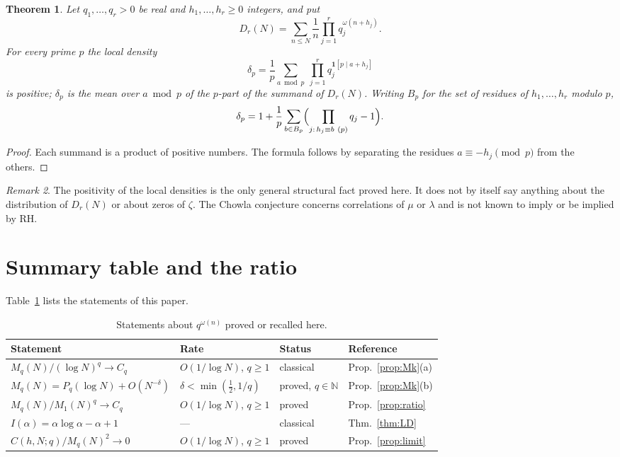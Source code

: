 \documentclass[11pt]{amsart}
\newtheorem{theorem}{Theorem}[section]
\theoremstyle{definition}
\theoremstyle{remark}
\newtheorem{remark}[theorem]{Remark}
\newcommand{\half}{\tfrac12}
\newcommand{\om}{\omega}
\begin{document}
\begin{theorem}\label{thm:impossible}
  Let $q_1,\ldots,q_r>0$ be real and $h_1,\ldots,h_r\ge 0$ integers, and put
  \[
    D_r(N) = \sum_{n\le N}\frac1n\prod_{j=1}^r q_j^{\om(n+h_j)}.
  \]
  For every prime $p$ the local density
  \[
    \delta_p=\frac1p\sum_{a\bmod p}\ \prod_{j=1}^r q_j^{\mathbf 1[p\mid a+h_j]}
  \]
  is positive; $\delta_p$ is the mean over $a\bmod p$ of the $p$-part of the summand of
  $D_r(N)$.  Writing $B_p$ for the set of residues of $h_1,\dots,h_r$ modulo $p$,
  \[
    \delta_p=1+\frac1p\sum_{b\in B_p}\Bigl(\prod_{j:\,h_j\equiv b\ (p)}q_j-1\Bigr).
  \]
\end{theorem}
\begin{proof}
  Each summand is a product of positive numbers.  The formula follows by separating the
  residues $a\equiv-h_j\pmod p$ from the others.
\end{proof}

\begin{remark}
  The positivity of the local densities is the only general structural fact proved here.
  It does not by itself say anything about the distribution of $D_r(N)$ or about zeros of
  $\zeta$.  The Chowla conjecture concerns correlations of $\mu$ or $\lambda$ and is not
  known to imply or be implied by RH.
\end{remark}

\section{Summary table and the ratio}
\label{sec:table}

Table~\ref{tab:info} lists the statements of this paper.

\begin{table}[h]
\centering
\begin{tabular}{llll}
\hline
Statement & Rate & Status & Reference \\
\hline
$M_q(N)/(\log N)^q \to C_q$ & $O(1/\log N)$, $q\ge1$ & classical & Prop.~\ref{prop:Mk}(a) \\
$M_q(N)=P_q(\log N)+O(N^{-\delta})$ & $\delta<\min(\half,1/q)$ & proved, $q\in\mathbb N$ & Prop.~\ref{prop:Mk}(b) \\
$M_q(N)/M_1(N)^q \to C_q$ & $O(1/\log N)$, $q\ge1$ & proved & Prop.~\ref{prop:ratio} \\
$I(\alpha)=\alpha\log\alpha-\alpha+1$ & --- & classical & Thm.~\ref{thm:LD} \\
$C(h,N;q)/M_q(N)^2\to0$ & $O(1/\log N)$, $q\ge1$ & proved & Prop.~\ref{prop:limit} \\
\hline
\end{tabular}
\caption{Statements about $q^{\om(n)}$ proved or recalled here.}
\label{tab:info}
\end{table}
\end{document}
